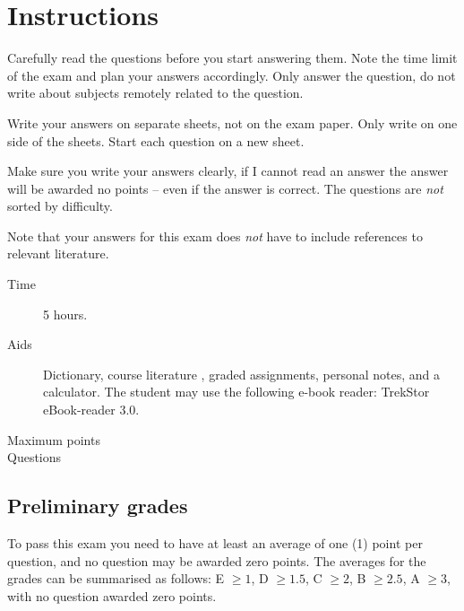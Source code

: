 \documentclass[addpoints,svv]{miunexam}
\date{2014-04-24}
\author{%
	Daniel Bosk\\
  {\small\texttt{\href{mailto:daniel.bosk@miun.se}{daniel.bosk@miun.se}}}\\
  {\small\textit{Phone:} 060\,-\,14\,8709}\\
}
\begin{document}
\maketitle
\thispagestyle{foot}

\section*{Instructions}
\label{sec:Instructions}
Carefully read the questions before you start answering them.
Note the time limit of the exam and plan your answers accordingly.
Only answer the question, do not write about subjects remotely related to the
question.

Write your answers on separate sheets, not on the exam paper.
Only write on one side of the sheets.
Start each question on a new sheet.

Make sure you write your answers clearly, if I cannot read an answer the answer
will be awarded no points -- even if the answer is correct.
The questions are \emph{not} sorted by difficulty.

Note that your answers for this exam does \emph{not} have to include references 
to relevant literature.

\begin{description}
	\item[Time] 5 hours.
  \item[Aids] Dictionary,
    course literature 
    \cite{Silberschatz2009osc,Silberschatz2013osc,Silberschatz2013intl},
    graded assignments,
    personal notes,
    and a calculator.
    The student may use the following e-book reader:
    TrekStor eBook-reader 3.0.
	\item[Maximum points] \numpoints
	\item[Questions] \numquestions
\end{description}


\subsection*{Preliminary grades}

To pass this exam you need to have at least an average of one (1) point per 
question, and no question may be awarded zero points.
The averages for the grades can be summarised as follows:
E \(\geq 1\),
D \(\geq 1.5\),
C \(\geq 2\),
B \(\geq 2.5\),
A \(\geq 3\),
with no question awarded zero points.
\end{document}
